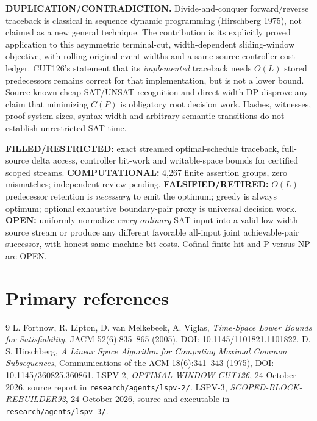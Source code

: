 \documentclass[11pt]{article}
\begin{document}
\textbf{DUPLICATION/CONTRADICTION.} Divide-and-conquer forward/reverse traceback is classical in sequence dynamic programming (Hirschberg 1975), not claimed as a new general technique. The contribution is its explicitly proved application to this asymmetric terminal-cut, width-dependent sliding-window objective, with rolling original-event widths and a same-source controller cost ledger. CUT126's statement that its \emph{implemented} traceback needs $O(L)$ stored predecessors remains correct for that implementation, but is not a lower bound. Source-known cheap SAT/UNSAT recognition and direct width DP disprove any claim that minimizing $C(P)$ is obligatory root decision work. Hashes, witnesses, proof-system sizes, syntax width and arbitrary semantic transitions do not establish unrestricted SAT time.

\textbf{FILLED/RESTRICTED:} exact streamed optimal-schedule traceback, full-source delta access, controller bit-work and writable-space bounds for certified scoped streams.
\textbf{COMPUTATIONAL:} 4,267 finite assertion groups, zero mismatches; independent review pending.
\textbf{FALSIFIED/RETIRED:} $O(L)$ predecessor retention is \emph{necessary} to emit the optimum; greedy is always optimum; optional exhaustive boundary-pair proxy is universal decision work.
\textbf{OPEN:} uniformly normalize \emph{every ordinary} SAT input into a valid low-width source stream or produce any different favorable all-input joint achievable-pair successor, with honest same-machine bit costs. Cofinal finite hit and P versus NP are OPEN.

\section{Primary references}
\begin{thebibliography}{9}
 L. Fortnow, R. Lipton, D. van Melkebeek, A. Viglas, \emph{Time-Space Lower Bounds for Satisfiability}, JACM 52(6):835--865 (2005), DOI: 10.1145/1101821.1101822.
 D. S. Hirschberg, \emph{A Linear Space Algorithm for Computing Maximal Common Subsequences}, Communications of the ACM 18(6):341--343 (1975), DOI: 10.1145/360825.360861.
 LSPV-2, \emph{OPTIMAL-WINDOW-CUT126}, 24 October 2026, source report in \texttt{research/agents/lspv-2/}.
 LSPV-3, \emph{SCOPED-BLOCK-REBUILDER92}, 24 October 2026, source and executable in \texttt{research/agents/lspv-3/}.
\end{thebibliography}
\end{document}
